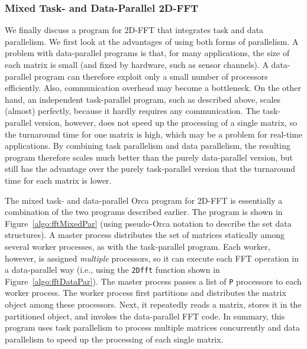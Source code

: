 \documentclass{acmtrans2e}
\begin{document}
\subsubsection*{Mixed Task- and Data-Parallel 2D-FFT}

We finally discuss a program for 2D-FFT that integrates task and
data parallelism.
We first look at the advantages of using both forms of parallelism.
A problem with data-parallel programs is that, for many applications,
the size of each matrix is small
(and fixed by hardware, such as sensor channels).
A data-parallel program can therefore exploit only a small number of
processors efficiently.
Also, communication overhead may become a bottleneck.
On the other hand, an independent task-parallel program, such as described
above, scales (almost) perfectly, because it hardly requires any
communication.
The task-parallel version, however, does not speed up the processing
of a single matrix, so the turnaround time for one matrix is high,
which may be a problem for real-time applications.
By combining task parallelism and data parallelism, the resulting
program therefore scales much better than the purely data-parallel
version, but still has the advantage over the purely task-parallel version
that the turnaround time for each matrix is lower.

The mixed task- and data-parallel Orca program for 2D-FFT is essentially
a combination of the two programs described earlier.
The program is shown in Figure~\ref{algo:fftMixedPar}
(using pseudo-Orca notation to describe the set data structures).
A master process distributes the set of matrices statically among
several worker processes, as with the task-parallel program.
Each worker, however, is assigned {\em multiple} processors, so it
can execute each FFT operation in a data-parallel way
(i.e., using the \verb+2Dfft+ function shown in Figure~\ref{algo:fftDataPar}).
The master process passes a list of \verb+P+ processors to each worker process.
The worker process first partitions and distributes the matrix object
among these processors. Next, it repeatedly reads a matrix, stores
it in the partitioned object, and invokes the data-parallel FFT code.
In summary, this program uses task parallelism to process multiple
matrices concurrently and data parallelism to speed up the processing
of each single matrix.
\end{document}
